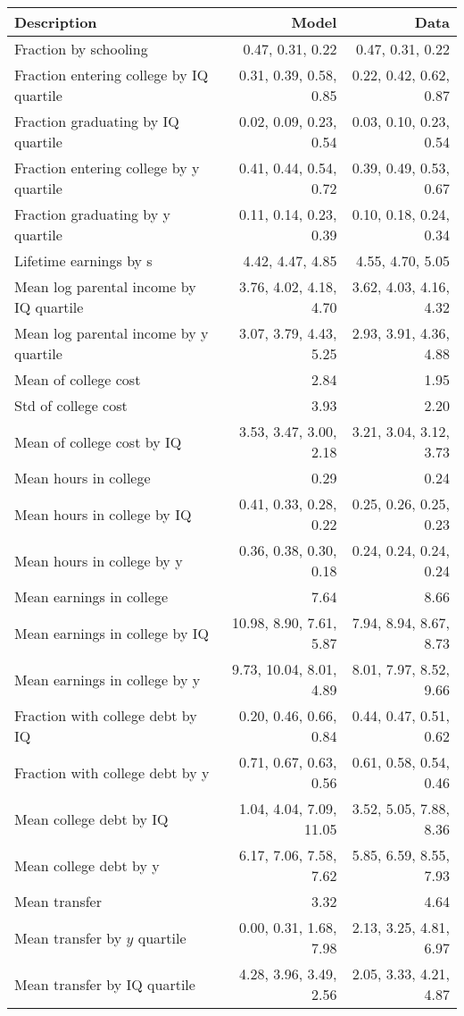 \begin{tabular}{lrr}
\hline
Description & Model  & Data  \\
\hline
Fraction by schooling & 0.47, 0.31, 0.22  & 0.47, 0.31, 0.22  \\
Fraction entering college by IQ quartile & 0.31, 0.39, 0.58, 0.85  & 0.22, 0.42, 0.62, 0.87  \\
Fraction graduating by IQ quartile & 0.02, 0.09, 0.23, 0.54  & 0.03, 0.10, 0.23, 0.54  \\
Fraction entering college by y quartile & 0.41, 0.44, 0.54, 0.72  & 0.39, 0.49, 0.53, 0.67  \\
Fraction graduating by y quartile & 0.11, 0.14, 0.23, 0.39  & 0.10, 0.18, 0.24, 0.34  \\
Lifetime earnings by s & 4.42, 4.47, 4.85  & 4.55, 4.70, 5.05  \\
Mean log parental income by IQ quartile & 3.76, 4.02, 4.18, 4.70  & 3.62, 4.03, 4.16, 4.32  \\
Mean log parental income by y quartile & 3.07, 3.79, 4.43, 5.25  & 2.93, 3.91, 4.36, 4.88  \\
Mean of college cost & 2.84  & 1.95  \\
Std of college cost & 3.93  & 2.20  \\
Mean of college cost by IQ & 3.53, 3.47, 3.00, 2.18  & 3.21, 3.04, 3.12, 3.73  \\
Mean hours in college & 0.29  & 0.24  \\
Mean hours in college by IQ & 0.41, 0.33, 0.28, 0.22  & 0.25, 0.26, 0.25, 0.23  \\
Mean hours in college by y & 0.36, 0.38, 0.30, 0.18  & 0.24, 0.24, 0.24, 0.24  \\
Mean earnings in college & 7.64  & 8.66  \\
Mean earnings in college by IQ & 10.98, 8.90, 7.61, 5.87  & 7.94, 8.94, 8.67, 8.73  \\
Mean earnings in college by y & 9.73, 10.04, 8.01, 4.89  & 8.01, 7.97, 8.52, 9.66  \\
Fraction with college debt by IQ & 0.20, 0.46, 0.66, 0.84  & 0.44, 0.47, 0.51, 0.62  \\
Fraction with college debt by y & 0.71, 0.67, 0.63, 0.56  & 0.61, 0.58, 0.54, 0.46  \\
Mean college debt by IQ & 1.04, 4.04, 7.09, 11.05  & 3.52, 5.05, 7.88, 8.36  \\
Mean college debt by y & 6.17, 7.06, 7.58, 7.62  & 5.85, 6.59, 8.55, 7.93  \\
Mean transfer & 3.32  & 4.64  \\
Mean transfer by $y$ quartile & 0.00, 0.31, 1.68, 7.98  & 2.13, 3.25, 4.81, 6.97  \\
Mean transfer by IQ quartile & 4.28, 3.96, 3.49, 2.56  & 2.05, 3.33, 4.21, 4.87  \\
\hline
\end{tabular}%
